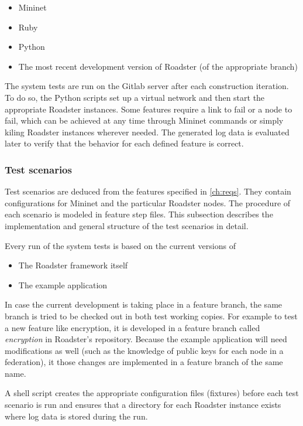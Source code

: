 \begin{itemize}
	\item Mininet
	\item Ruby
	\item Python
	\item The most recent development version of Roadster (of the appropriate branch)
\end{itemize}

The system tests are run on the Gitlab server after each construction
iteration. To do so, the Python scripts set up a virtual network and then start
the appropriate Roadster instances. Some features require a link to fail or a
node to fail, which can be achieved at any time through Mininet commands or
simply kiling Roadster instances wherever needed. The generated log data is
evaluated later to verify that the behavior for each defined feature is
correct.


\subsubsection{Test scenarios}
Test scenarios are deduced from the features specified in \autoref{ch:reqs}.
They contain configurations for Mininet and the particular Roadster nodes.
The procedure of each scenario is modeled in feature step files. This subsection
describes the implementation and general structure of the test scenarios in detail.


Every run of the system tests is based on the current versions of

\begin{itemize}
	\item The Roadster framework itself
	\item The example application
\end{itemize}

In case the current development is taking place in a feature branch, the same
branch is tried to be checked out in both test working copies. For example to
test a new feature like encryption, it is developed in a feature branch called
\emph{encryption} in Roadster's repository. Because the example application
will need modifications as well (such as the knowledge of public keys for each
node in a federation), it those changes are implemented in a feature branch of
the same name.

A shell script creates the appropriate configuration files (fixtures) before
each test scenario is run and ensures that a directory for each Roadster
instance exists where log data is stored during the run.

